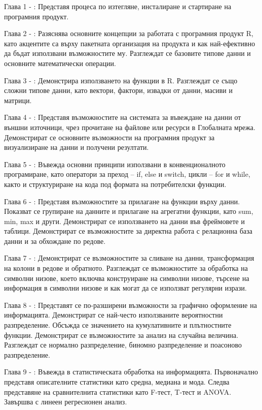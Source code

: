 Глава 1 - : Представя процеса по изтегляне, инсталиране и стартиране на програмния продукт.

Глава 2 - : Разяснява основните концепции за работата с програмния продукт R, като акцентите са върху пакетната организация на продукта и как най-ефективно да бъдат използвани възможностите му. Разглеждат се базовите типове данни и основните математически операции. 

Глава 3 - : Демонстрира използването на функции в R. Разглеждат се също сложни типове данни, като вектори, фактори, извадки от данни, масиви и матрици. 

Глава 4 - : Представя възможностите на системата за въвеждане на данни от външни източници, чрез прочитане на файлове или ресурси в Глобалната мрежа. Демонстрират се основните възможности на програмния продукт за визуализиране на данни и получени резултати.  

Глава 5 - : Въвежда основни принципи използвани в конвенционалното програмиране, като оператори за преход – if, else и switch, цикли – for и while, както и структуриране на кода под формата на потребителски функции.

Глава 6 - : Представя възможностите за прилагане на функции върху данни. Показват се групиране на данните и прилагане на агрегатни функции, като sum, min, max и други. Демонстрират се използването на данни във фреймовете и таблици. Демонстрират се възможностите за директна работа с релационна база данни и за обхождане по редове.

Глава 7 - : Демонстрират се възможностите за сливане на данни, трансформация на колони в редове и обратното. Разглеждат се възможностите за обработка на символни низове, което включва конструиране на символни низове, търсене на информация в символни низове и как могат да се използват регулярни изрази. 

Глава 8 - : Представят се по-разширени възможности за графично оформление на информацията. Демонстрират се най-често използваните вероятностни разпределение. Обсъжда се значението на кумулативните и плътностните функции. Демонстрират се възможностите за анализ на случайна величина. Разглеждат се нормално разпределение, биномно разпределение и поасоново разпределение.

Глава 9 - : Въвежда в статистическата обработка на информацията. Първоначално представя описателните статистики като средна, медиана и мода. Следва представяне на сравнителнита статистики като F-тест, T-тест и ANOVA. Завършва с линеен регресионен анализ. 

